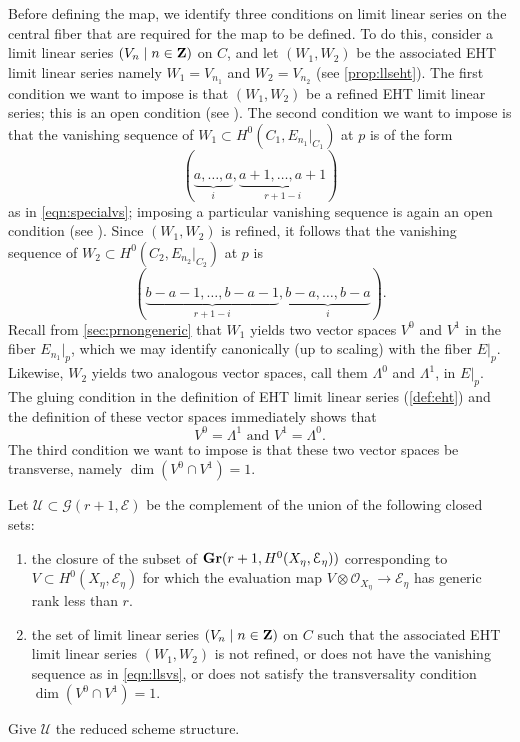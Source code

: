 \documentclass[11pt,reqno]{amsart}
\theoremstyle{plain}
\theoremstyle{definition}
\theoremstyle{remark}
\numberwithin{equation}{section}
\renewcommand{\to}{{\longrightarrow}}
\numberwithin{equation}{section}
\renewcommand{\O}{\mathcal O}
\begin{document}
Before defining the map, we identify three conditions on limit linear series on the central fiber that are required for the map to be defined.
To do this, consider a limit linear series $(V_n \mid n \in {\bf Z})$ on $C$, and let $(W_1, W_2)$ be the associated EHT limit linear series namely $W_1 = V_{n_1}$ and $W_2 = V_{n_2}$ (see \autoref{prop:llseht}).
The first condition we want to impose is that $(W_1, W_2)$ be a refined EHT limit linear series; this is an open condition (see \cite[Proposition~4.1.5]{oss:14}).
The second condition we want to impose is that the vanishing sequence of $W_1 \subset H^0(C_1, E_{n_1}|_{C_1})$ at $p$ is of the form
\begin{equation}\label{eqn:llsvs}
  (\underbrace{a, \dots, a}_i, \underbrace{a+1, \dots, a+1}_{r+1-i})
\end{equation}
as in \eqref{eqn:specialvs}; imposing a particular vanishing sequence is again an open condition (see \cite[Proposition~4.2.5]{oss:14}).
Since $(W_1, W_2)$ is refined, it follows that the vanishing sequence of $W_2 \subset H^0(C_2, E_{n_2}|_{C_2})$ at $p$ is
\[ (\underbrace{b-a-1, \dots, b-a-1}_{r+1-i}, \underbrace{b-a, \dots, b-a}_{i}).\]
Recall from \autoref{sec:prnongeneric} that $W_1$ yields two vector spaces $V^0$ and $V^1$ in the fiber $E_{n_1}|_p$, which we may identify canonically (up to scaling) with the fiber $E|_p$.
Likewise, $W_2$ yields two analogous vector spaces, call them $\Lambda^0$ and $\Lambda^1$, in $E|_p$.
The gluing condition in the definition of EHT limit linear series (\autoref{def:eht}) and the definition of these vector spaces immediately shows that
\begin{equation}\label{eqn:vlambdaswitch}
  V^0 = \Lambda^1 \text{ and } V^1 = \Lambda^0.
\end{equation}
The third condition we want to impose is that these two vector spaces be transverse, namely $\dim (V^0 \cap V^1) = 1$.

Let $\mathcal U \subset {\mathcal G}(r+1, \mathcal E)$ be the complement of the union of the following closed sets:
\begin{enumerate}
\item the closure of the subset of ${\bf Gr}(r+1, H^0(X_\eta, \mathcal E_\eta))$ corresponding to $V \subset H^0(X_\eta, \mathcal E_\eta)$ for which the evaluation map $V\otimes\O_{X_\eta} \to \mathcal E_\eta$ has generic rank less than $r$.
\item the set of limit linear series $(V_n \mid n \in {\bf Z})$ on $C$ such that the associated EHT limit linear series $(W_1, W_2)$ is not refined, or does not have the vanishing sequence as in \eqref{eqn:llsvs}, or does not satisfy the transversality condition $\dim (V^0 \cap V^1) = 1$.
\end{enumerate}
Give $\mathcal U$ the reduced scheme structure.
\end{document}
